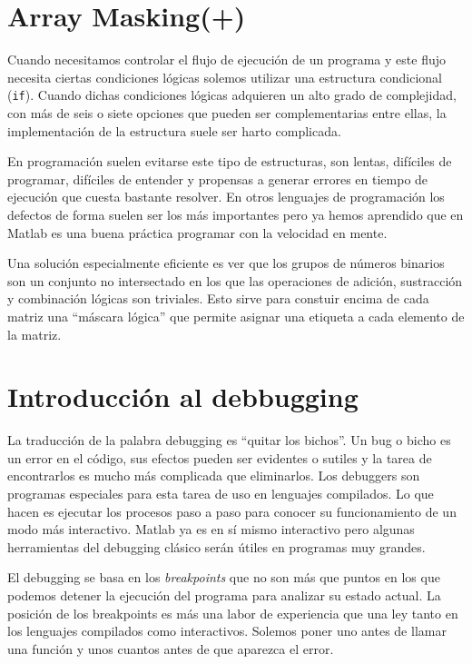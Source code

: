 \section{Array Masking(+)}

Cuando necesitamos controlar el flujo de ejecución de un programa y este
flujo necesita ciertas condiciones lógicas solemos utilizar una 
estructura condicional (\texttt{if}).  Cuando dichas condiciones lógicas
adquieren un alto grado de complejidad, con más de seis o siete opciones
que pueden ser complementarias entre ellas, la implementación de la
estructura suele ser harto complicada.

En programación suelen evitarse este tipo de estructuras, son lentas,
difíciles de programar, difíciles de entender y propensas a generar
errores en tiempo de ejecución que cuesta bastante resolver. En otros
lenguajes de programación los defectos de forma suelen ser los más
importantes pero ya hemos aprendido que en Matlab es una buena práctica
programar con la velocidad en mente.

Una solución especialmente eficiente es ver que los grupos de números
binarios son un conjunto no intersectado en los que las operaciones de
adición, sustracción y combinación lógicas son triviales. Esto sirve para
constuir encima de cada matriz una {}``máscara lógica'' que permite
asignar una etiqueta a cada elemento de la matriz.

\section{Introducción al debbugging}

La traducción de la palabra debugging es {}``quitar los bichos''.  Un
bug o bicho es un error en el código, sus efectos pueden ser evidentes
o sutiles y la tarea de encontrarlos es mucho más complicada que
eliminarlos.  Los debuggers son programas especiales para esta tarea
de uso en lenguajes compilados. Lo que hacen es ejecutar los procesos
paso a paso para conocer su funcionamiento de un modo más interactivo.
Matlab ya es en sí mismo interactivo pero algunas herramientas del
debugging clásico serán útiles en programas muy grandes.

El debugging se basa en los \emph{breakpoints} que no son más que
puntos en los que podemos detener la ejecución del programa para
analizar su estado actual. La posición de los breakpoints es más una
labor de experiencia que una ley tanto en los lenguajes compilados
como interactivos. Solemos poner uno antes de llamar una función y
unos cuantos antes de que aparezca el error.


